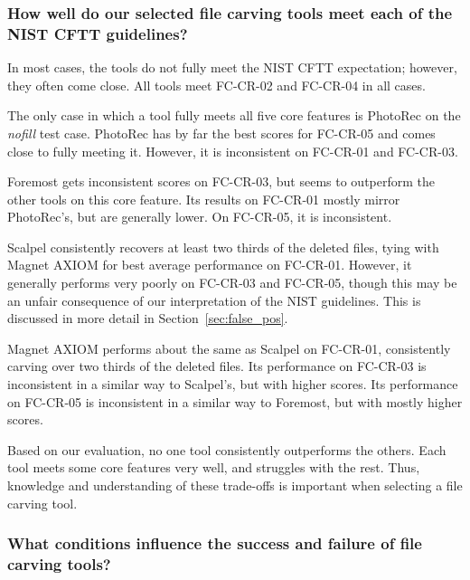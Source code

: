 \subsubsection{How well do our selected file carving tools meet each of the NIST CFTT guidelines?}

In most cases, the tools do not fully meet the NIST CFTT expectation; however, they often come close.
All tools meet FC-CR-02 and FC-CR-04 in all cases.

The only case in which a tool fully meets all five core features is PhotoRec on the \emph{nofill} test case.
PhotoRec has by far the best scores for FC-CR-05 and comes close to fully meeting it.
However, it is inconsistent on FC-CR-01 and FC-CR-03.

Foremost gets inconsistent scores on FC-CR-03, but seems to outperform the other tools on this core feature.
Its results on FC-CR-01 mostly mirror PhotoRec's, but are generally lower.
On FC-CR-05, it is inconsistent.

Scalpel consistently recovers at least two thirds of the deleted files, tying with Magnet AXIOM for best average performance on FC-CR-01.
However, it generally performs very poorly on FC-CR-03 and FC-CR-05, though this may be an unfair consequence of our interpretation of the NIST guidelines.
This is discussed in more detail in Section~\ref{sec:false_pos}.

Magnet AXIOM performs about the same as Scalpel on FC-CR-01, consistently carving over two thirds of the deleted files.
Its performance on FC-CR-03 is inconsistent in a similar way to Scalpel's, but with higher scores.
Its performance on FC-CR-05 is inconsistent in a similar way to Foremost, but with mostly higher scores.

Based on our evaluation, no one tool consistently outperforms the others.
Each tool meets some core features very well, and struggles with the rest.
Thus, knowledge and understanding of these trade-offs is important when selecting a file carving tool.




\subsubsection{What conditions influence the success and failure of file carving tools?}

